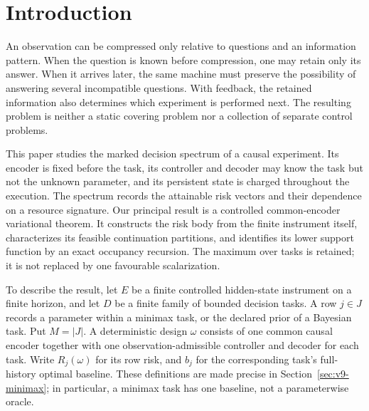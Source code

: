 \section{Introduction}
An observation can be compressed only relative to questions and an
information pattern. When the question is known before compression,
one may retain only its answer. When it arrives later, the same machine
must preserve the possibility of answering several incompatible
questions. With feedback, the retained information also determines which
experiment is performed next. The resulting problem is neither a static
covering problem nor a collection of separate control problems.

This paper studies the marked decision spectrum of a causal experiment.
Its encoder is fixed before the task, its controller and decoder may
know the task but not the unknown parameter, and its persistent state is
charged throughout the execution. The spectrum records the attainable
risk vectors and their dependence on a resource signature. Our principal
result is a controlled common-encoder variational theorem. It constructs
the risk body from the finite instrument itself, characterizes its
feasible continuation partitions, and identifies its lower support
function by an exact occupancy recursion. The maximum over tasks is
retained; it is not replaced by one favourable scalarization.

To describe the result, let $E$ be a finite controlled hidden-state
instrument on a finite horizon, and let $D$ be a finite family of bounded
decision tasks. A row $j\in J$ records a parameter within a minimax task,
or the declared prior of a Bayesian task. Put $M=|J|$. A deterministic
design $\omega$ consists of one common causal encoder together with one
observation-admissible controller and decoder for each task. Write
$R_j(\omega)$ for its row risk, and $b_j$ for the corresponding task's
full-history optimal baseline. These definitions are made precise in
Section~\ref{sec:v9-minimax}; in particular, a minimax task has one
baseline, not a parameterwise oracle.


